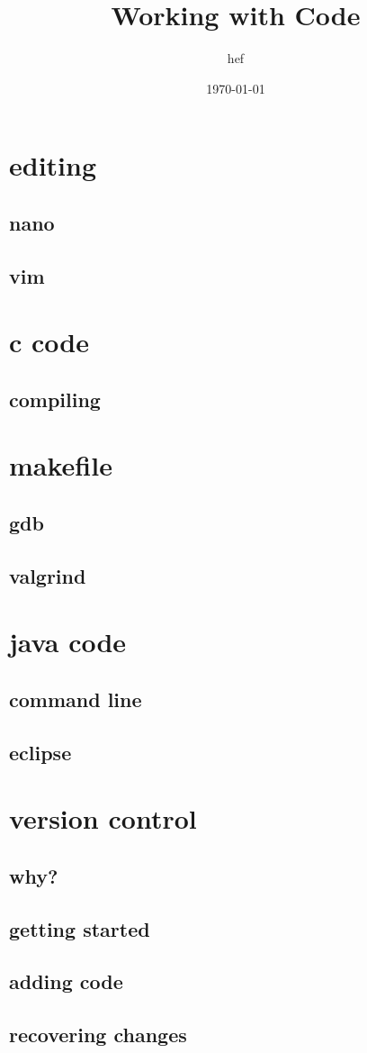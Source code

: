 \documentclass[hyperref={pdfpagelabels=false}]{beamer}
\title{Working with Code}
\author{hef}
\date{\today}
\begin{document}
\frame{\titlepage}
\section[outline]{}
\frame{\tableofcontents}
\section{editing}
\subsection{nano}
\subsection{vim}
\section{c code}
\subsection{compiling}
\section{makefile}
\subsection{gdb}
\subsection{valgrind}
\section{java code}
\subsection{command line}
\subsection{eclipse}
\section{version control}
\subsection{why?}
\subsection{getting started}
\subsection{adding code}
\subsection{recovering changes}
\end{document}
